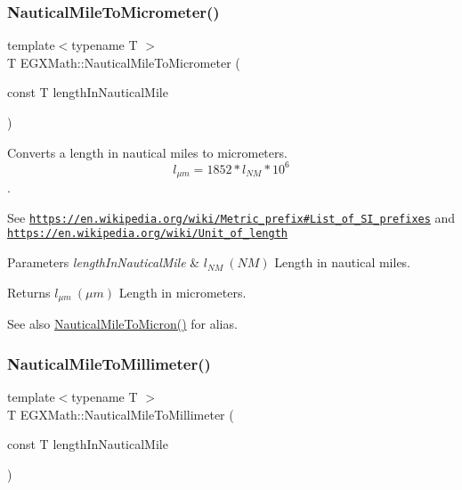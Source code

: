 \subsubsection{\texorpdfstring{Nautical\+Mile\+To\+Micrometer()}{NauticalMileToMicrometer()}}
{\footnotesize\ttfamily template$<$typename T $>$ \\
T E\+G\+X\+Math\+::\+Nautical\+Mile\+To\+Micrometer (\begin{DoxyParamCaption}\item[{const T}]{length\+In\+Nautical\+Mile }\end{DoxyParamCaption})}



Converts a length in nautical miles to micrometers. \[ l_{\mu m}=1852 * l_{NM} * 10^{6} \]. 

See \href{https://en.wikipedia.org/wiki/Metric_prefix#List_of_SI_prefixes}{\tt https\+://en.\+wikipedia.\+org/wiki/\+Metric\+\_\+prefix\#\+List\+\_\+of\+\_\+\+S\+I\+\_\+prefixes} and \href{https://en.wikipedia.org/wiki/Unit_of_length}{\tt https\+://en.\+wikipedia.\+org/wiki/\+Unit\+\_\+of\+\_\+length} 
\begin{DoxyParams}{Parameters}
{\em length\+In\+Nautical\+Mile} & $ l_{NM}\ (NM)$ Length in nautical miles. \\
\hline
\end{DoxyParams}
\begin{DoxyReturn}{Returns}
$ l_{\mu m}\ (\mu m)$ Length in micrometers. 
\end{DoxyReturn}
\begin{DoxySeeAlso}{See also}
\mbox{\hyperlink{group___e_g_x_math-_conversions-_length_conversions-_non-_s_i-_nautical_mile-_non-_s_i_gad80a4f8f82660ad19a420e55bfb33447}{Nautical\+Mile\+To\+Micron()}} for alias. 
\end{DoxySeeAlso}
\mbox{\label{group___e_g_x_math-_conversions-_length_conversions-_non-_s_i-_nautical_mile-_s_i_ga10840f2eeeb3fe428db89373cb306246}} 
\subsubsection{\texorpdfstring{Nautical\+Mile\+To\+Millimeter()}{NauticalMileToMillimeter()}}
{\footnotesize\ttfamily template$<$typename T $>$ \\
T E\+G\+X\+Math\+::\+Nautical\+Mile\+To\+Millimeter (\begin{DoxyParamCaption}\item[{const T}]{length\+In\+Nautical\+Mile }\end{DoxyParamCaption})}



